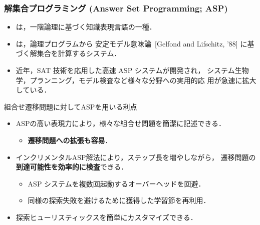 \documentclass[dvipdfmx,11pt]{beamer}
\begin{document}
\begin{frame}
  \frametitle{解集合プログラミング {\large(Answer Set Programming; ASP)}}
  \begin{itemize}
  \item {}は，一階論理に基づく知識表現言語の一種．
  \item {}は，論理プログラムから
    安定モデル意味論~{\scriptsize[Gelfond and Lifschitz, '88]}
    に基づく解集合を計算するシステム．
  \item 近年，SAT 技術を応用した高速 ASP システムが開発され，
    システム生物学，プランニング，モデル検査など様々な分野への実用的応
    用が急速に拡大している．
  \end{itemize}

  \begin{alertblock}{組合せ遷移問題に対してASPを用いる利点}
    \begin{itemize}
    \item ASPの高い表現力により，様々な組合せ問題を簡潔に記述できる．
      \begin{itemize}
      \item \alert{\bf 遷移問題への拡張も容易}．
      \end{itemize}
    \item インクリメンタルASP解法により，ステップ長を増やしながら，
      遷移問題の\alert{\bf 到達可能性を効率的に検査}できる．
      \begin{itemize}
      \item ASP システムを複数回起動するオーバーヘッドを回避．
      \item 同様の探索失敗を避けるために獲得した学習節を再利用．
      \end{itemize}
    \item 探索ヒューリスティックスを簡単にカスタマイズできる．
    \end{itemize}
  \end{alertblock}
\end{frame}
\end{document}
